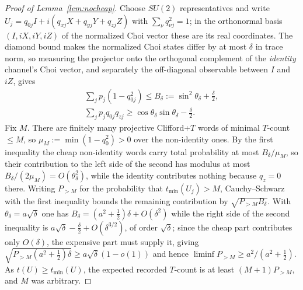 \documentclass[aps,prx,twocolumn,superscriptaddress,nofootinbib,longbibliography]{revtex4-2}
\theoremstyle{plain}
\theoremstyle{definition}
\theoremstyle{remark}
\begin{document}
\begin{proof}[Proof of Lemma~\ref{lem:nocheap}]
Choose $SU(2)$ representatives and write $U_j=q_{0j}I+i(q_{xj}X+q_{yj}Y+q_{zj}Z)$ with $\sum_\nu q_{\nu j}^2=1$; in the orthonormal basis $(I,iX,iY,iZ)$ of the normalized Choi vector these are its real coordinates. The diamond bound makes the normalized Choi states differ by at most $\delta$ in trace norm, so measuring the projector onto the orthogonal complement of the \emph{identity} channel's Choi vector, and separately the off-diagonal observable between $I$ and $iZ$, gives
\[
\begin{gathered}
\sum_jp_j(1-q_{0j}^2)\le B_\delta:=\sin^2\theta_\delta+\tfrac\delta2,\\
\sum_jp_jq_{0j}q_{zj}\ge\cos\theta_\delta\sin\theta_\delta-\tfrac\delta2 .
\end{gathered}
\]
Fix $M$. There are finitely many projective Clifford+$T$ words of minimal $T$-count $\le M$, so $\mu_M:=\min(1-q_0^2)>0$ over the non-identity ones. By the first inequality the cheap non-identity words carry total probability at most $B_\delta/\mu_M$, so their contribution to the left side of the second has modulus at most $B_\delta/(2\mu_M)=O(\theta_\delta^2)$, while the identity contributes nothing because $q_z=0$ there. Writing $P_{>M}$ for the probability that $t_{\min}(U_j)>M$, Cauchy--Schwarz with the first inequality bounds the remaining contribution by $\sqrt{P_{>M}B_\delta}$. With $\theta_\delta=a\sqrt\delta$ one has $B_\delta=(a^2+\tfrac12)\delta+O(\delta^2)$ while the right side of the second inequality is $a\sqrt\delta-\tfrac\delta2+O(\delta^{3/2})$, of order $\sqrt\delta$; since the cheap part contributes only $O(\delta)$, the expensive part must supply it, giving $\sqrt{P_{>M}(a^2+\tfrac12)\delta}\ge a\sqrt\delta(1-o(1))$ and hence $\liminf P_{>M}\ge a^2/(a^2+\tfrac12)$. As $t(U)\ge t_{\min}(U)$, the expected recorded $T$-count is at least $(M+1)P_{>M}$, and $M$ was arbitrary.
\end{proof}
\end{document}
